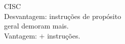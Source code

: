 \documentclass[preview]{standalone}
\begin{document}
CISC\\ Desvantagem: instruções de propósito\\ geral demoram mais. \\Vantagem: $+$ instruções.\\
\end{document}
